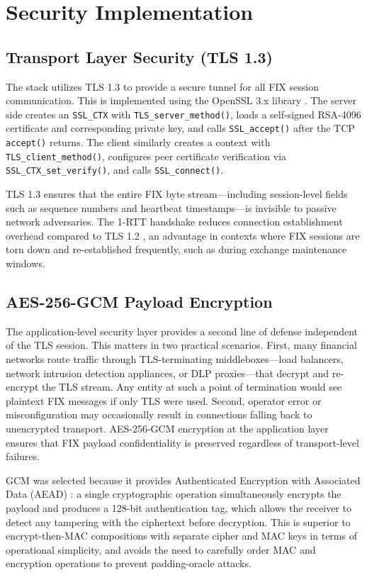 \documentclass[twocolumn,10pt]{article}
\begin{document}
\section{Security Implementation}

\subsection{Transport Layer Security (TLS 1.3)}

The stack utilizes TLS 1.3 \cite{rfc8446} to provide a secure tunnel for all
FIX session communication. This is implemented using the OpenSSL 3.x library
\cite{openssl}. The server side creates an \texttt{SSL\_CTX} with
\texttt{TLS\_server\_method()}, loads a self-signed RSA-4096 certificate and
corresponding private key, and calls \texttt{SSL\_accept()} after the TCP
\texttt{accept()} returns. The client similarly creates a context with
\texttt{TLS\_client\_method()}, configures peer certificate verification via
\texttt{SSL\_CTX\_set\_verify()}, and calls \texttt{SSL\_connect()}.

TLS 1.3 ensures that the entire FIX byte stream—including session-level
fields such as sequence numbers and heartbeat timestamps—is invisible to
passive network adversaries. The 1-RTT handshake reduces connection
establishment overhead compared to TLS 1.2 \cite{rfc5246}, an advantage in
contexts where FIX sessions are torn down and re-established frequently, such
as during exchange maintenance windows.

\subsection{AES-256-GCM Payload Encryption}

The application-level security layer provides a second line of defense
independent of the TLS session. This matters in two practical scenarios.
First, many financial networks route traffic through TLS-terminating
middleboxes—load balancers, network intrusion detection appliances, or DLP
proxies—that decrypt and re-encrypt the TLS stream. Any entity at such a
point of termination would see plaintext FIX messages if only TLS were used.
Second, operator error or misconfiguration may occasionally result in
connections falling back to unencrypted transport. AES-256-GCM encryption
at the application layer ensures that FIX payload confidentiality is
preserved regardless of transport-level failures.

GCM was selected because it provides Authenticated Encryption with Associated
Data (AEAD) \cite{nist80038d,mcgrew2004gcm}: a single cryptographic operation
simultaneously encrypts the payload and produces a 128-bit authentication
tag, which allows the receiver to detect any tampering with the ciphertext
before decryption. This is superior to encrypt-then-MAC compositions with
separate cipher and MAC keys in terms of operational simplicity, and avoids
the need to carefully order MAC and encryption operations to prevent
padding-oracle attacks.
\end{document}

